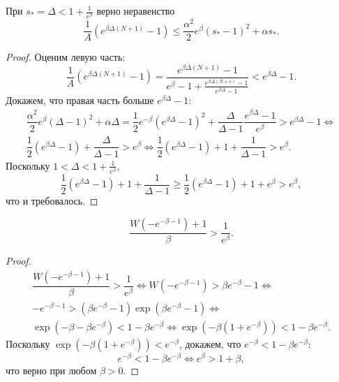 \begin{proposition}
	При $s_* = \Delta < 1 + \frac{1}{e^{\beta}}$ верно неравенство
	$$
	\dfrac{1}{A}\left(e^{\beta\Delta(N + 1)} - 1\right) \leqslant \dfrac{\alpha^2}{2}e^{\beta}(s_* - 1)^2 + \alpha s_*.
	$$
\end{proposition}
\begin{proof}
	Оценим левую часть:
	\[
	\dfrac{1}{A}\left(e^{\beta\Delta(N + 1)} - 1\right) = \dfrac{e^{\beta\Delta(N + 1)} - 1}{e^{\beta} - 1 + \frac{e^{\beta\Delta(N + 1)} - 1}{e^{\beta\Delta} - 1}} < e^{\beta \Delta} - 1.
	\]
	Докажем, что правая часть больше $e^{\beta \Delta} - 1$:
	\begin{multline*}
		\dfrac{\alpha^2}{2}e^{\beta}(\Delta - 1)^2 + \alpha\Delta = \dfrac{1}{2}e^{-\beta}(e^{\beta\Delta} - 1)^2 + \dfrac{\Delta}{\Delta - 1}\dfrac{e^{\beta\Delta} - 1}{e^{\beta}} > e^{\beta \Delta} - 1 \Leftrightarrow\\
		\dfrac{1}{2}(e^{\beta\Delta} - 1) + \dfrac{\Delta}{\Delta - 1} > e^{\beta} \Leftrightarrow
		\dfrac{1}{2}(e^{\beta\Delta} - 1) + 1 + \dfrac{1}{\Delta - 1} > e^{\beta}.
	\end{multline*}
	Поскольку $1 < \Delta < 1 + \frac{1}{e^{\beta}}$,
	$$
	\dfrac{1}{2}(e^{\beta\Delta} - 1) + 1 + \dfrac{1}{\Delta - 1} \geqslant \dfrac{1}{2}(e^{\beta\Delta} - 1) + 1 + e^{\beta} > e^{\beta},
	$$
	что и требовалось.
\end{proof}

\begin{lemma}
	\label{lm:delta_min}
	$$\dfrac{W(-e^{-\beta - 1}) + 1}{\beta} > \dfrac{1}{e^{\beta}}.$$
\end{lemma}
\begin{proof}
	\begin{multline*}
		\dfrac{W(-e^{-\beta - 1}) + 1}{\beta} > \dfrac{1}{e^{\beta}} \Leftrightarrow
		W(-e^{-\beta - 1}) > \beta e^{-\beta} - 1 \Leftrightarrow \\
		-e^{-\beta - 1} > (\beta e^{-\beta} - 1)\exp(\beta e^{-\beta} - 1) \Leftrightarrow \\
		\exp(-\beta - \beta e^{-\beta}) < 
		1 - \beta e^{-\beta} \Leftrightarrow \exp(-\beta(1 + e^{-\beta})) < 1 - \beta e^{-\beta}.
	\end{multline*}
	Поскольку $\exp(-\beta(1 + e^{-\beta})) < e^{-\beta}$, докажем, что $e^{-\beta} < 1 - \beta e^{-\beta}$:
	\[
	e^{-\beta} < 1 - \beta e^{-\beta} \Leftrightarrow e^{\beta} > 1 + \beta,
	\]
	что верно при любом $\beta > 0$.
\end{proof}

